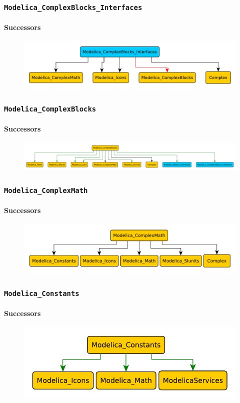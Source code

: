 \documentclass[aspectratio=1610]{beamer}
\begin{document}
\begin{frame}
  \frametitle{\texttt{Modelica\_ComplexBlocks\_Interfaces}}
  \framesubtitle{Successors}
  \begin{figure}
      \includegraphics[width=\textwidth]{Modelica_ComplexBlocks_Interfaces}
  \end{figure}
\end{frame}

\begin{frame}
  \frametitle{\texttt{Modelica\_ComplexBlocks}}
  \framesubtitle{Successors}
  \begin{figure}
      \includegraphics[width=\textwidth]{Modelica_ComplexBlocks}
  \end{figure}
\end{frame}

\begin{frame}
  \frametitle{\texttt{Modelica\_ComplexMath}}
  \framesubtitle{Successors}
  \begin{figure}
      \includegraphics[width=\textwidth]{Modelica_ComplexMath}
  \end{figure}
\end{frame}

\begin{frame}
  \frametitle{\texttt{Modelica\_Constants}}
  \framesubtitle{Successors}
  \begin{figure}
      \includegraphics[width=\textwidth]{Modelica_Constants}
  \end{figure}
\end{frame}
\end{document}
